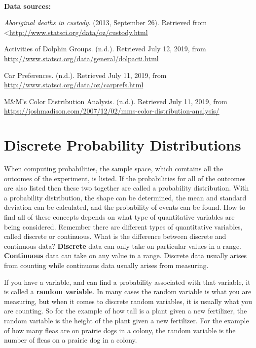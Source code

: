 \documentclass[
]{book}
\begin{document}
\textbf{\\
}

\textbf{Data sources:}

\emph{Aboriginal deaths in custody}. (2013, September 26). Retrieved from
\textless{}\url{http://www.statsci.org/data/oz/custody.html}

Activities of Dolphin Groups. (n.d.). Retrieved July 12, 2019, from \url{http://www.statsci.org/data/general/dolpacti.html}

Car Preferences. (n.d.). Retrieved July 11, 2019, from \url{http://www.statsci.org/data/oz/carprefs.html}

M\&M's Color Distribution Analysis. (n.d.). Retrieved July 11, 2019, from \url{https://joshmadison.com/2007/12/02/mms-color-distribution-analysis/}

\hypertarget{discrete-probability-distributions}{%
\chapter{Discrete Probability Distributions}\label{discrete-probability-distributions}}

When computing probabilities, the sample space, which comtains all the outcomes of the experiment, is listed. If the probabilities for all of the outcomes are also listed then these two together are called a probability distribution. With a probability distribution, the shape can be determined, the mean and standard deviation can be calculated, and the probability of events can be found. How to find all of these concepts depends on what type of quantitative variables are being considered. Remember there are different types of quantitative variables, called discrete or continuous. What is the difference between discrete and continuous data? \textbf{Discrete} data can only take on particular values in a range. \textbf{Continuous} data can take on any value in a range. Discrete data usually arises from counting while continuous data usually arises from measuring.

If you have a variable, and can find a probability associated with that variable, it is called a \textbf{random variable}. In many cases the random variable is what you are measuring, but when it comes to discrete random variables, it is usually what you are counting. So for the example of how tall is a plant given a new fertilizer, the random variable is the height of the plant given a new fertilizer. For the example of how many fleas are on prairie dogs in a colony, the random variable is the number of fleas on a prairie dog in a colony.
\end{document}
